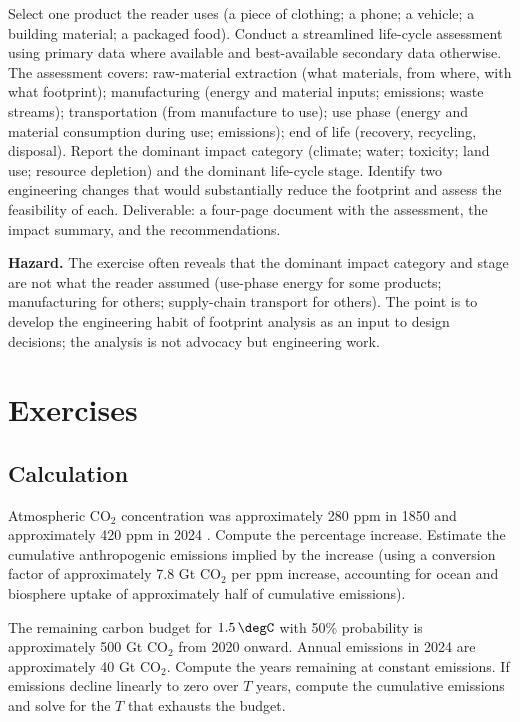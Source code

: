 \begin{project}
Select one product the reader uses (a piece of clothing; a phone; a vehicle; a building material; a packaged food). Conduct a streamlined life-cycle assessment using primary data where available and best-available secondary data otherwise. The assessment covers: raw-material extraction (what materials, from where, with what footprint); manufacturing (energy and material inputs; emissions; waste streams); transportation (from manufacture to use); use phase (energy and material consumption during use; emissions); end of life (recovery, recycling, disposal). Report the dominant impact category (climate; water; toxicity; land use; resource depletion) and the dominant life-cycle stage. Identify two engineering changes that would substantially reduce the footprint and assess the feasibility of each. Deliverable: a four-page document with the assessment, the impact summary, and the recommendations.

\textbf{Hazard.} The exercise often reveals that the dominant impact category and stage are not what the reader assumed (use-phase energy for some products; manufacturing for others; supply-chain transport for others). The point is to develop the engineering habit of footprint analysis as an input to design decisions; the analysis is not advocacy but engineering work.
\end{project}

\section{Exercises}

\subsection*{Calculation}

\begin{exercise}
Atmospheric CO$_2$ concentration was approximately 280 ppm in 1850 and approximately 420 ppm in 2024 \cite{std:ipcc-ar6-wg1-2021}. Compute the percentage increase. Estimate the cumulative anthropogenic emissions implied by the increase (using a conversion factor of approximately 7.8 Gt CO$_2$ per ppm increase, accounting for ocean and biosphere uptake of approximately half of cumulative emissions).
\end{exercise}

\begin{exercise}
The remaining carbon budget for $1.5\,\degC$ with 50\% probability is approximately 500 Gt CO$_2$ from 2020 onward. Annual emissions in 2024 are approximately 40 Gt CO$_2$. Compute the years remaining at constant emissions. If emissions decline linearly to zero over $T$ years, compute the cumulative emissions and solve for the $T$ that exhausts the budget.
\end{exercise}

